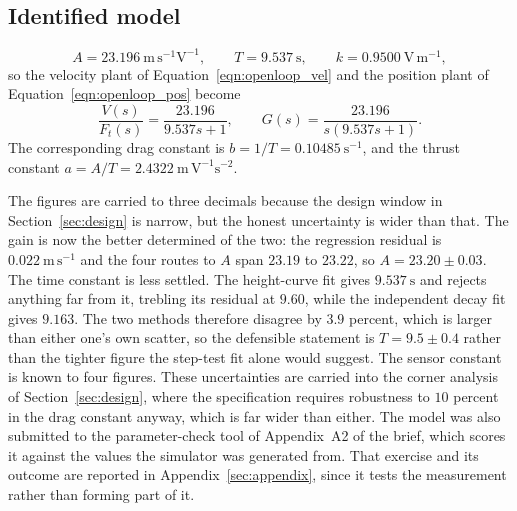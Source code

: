 \subsection{Identified model}
\begin{equation}\label{eqn:identified}
    A = 23.196\ \mathrm{m\,s^{-1}V^{-1}}, \qquad
    T = 9.537\ \mathrm{s}, \qquad
    k = 0.9500\ \mathrm{V\,m^{-1}} ,
\end{equation}
so the velocity plant of Equation~\eqref{eqn:openloop_vel} and the position plant of
Equation~\eqref{eqn:openloop_pos} become
\begin{equation}
    \frac{V(s)}{F_t(s)} = \frac{23.196}{9.537s + 1},
    \qquad
    G(s) = \frac{23.196}{s\left(9.537s + 1\right)} .
\end{equation}
The corresponding drag constant is $b = 1/T = 0.10485\ \mathrm{s^{-1}}$, and the thrust constant $a = A/T = 2.4322\ \mathrm{m\,V^{-1}s^{-2}}$.

The figures are carried to three decimals because the design window in
Section~\ref{sec:design} is narrow, but the honest uncertainty is wider than that. The gain is now
the better determined of the two: the regression residual is $0.022\ \mathrm{m\,s^{-1}}$ and the
four routes to $A$ span $23.19$ to $23.22$, so $A = 23.20 \pm 0.03$. The time constant is less settled. The height-curve fit gives $9.537\ \mathrm{s}$ and rejects
anything far from it, trebling its residual at $9.60$, while the independent decay fit gives
$9.163$. The two methods therefore disagree by $3.9$ percent, which is larger than either one's own
scatter, so the defensible statement is $T = 9.5 \pm 0.4$ rather than the tighter figure the
step-test fit alone would suggest. The sensor constant is known to four figures. These uncertainties are carried into the
corner analysis of Section~\ref{sec:design}, where the specification requires robustness to
$10$ percent in the drag constant anyway, which is far wider than either.
The model was also submitted to the parameter-check tool of Appendix~A2 of the brief, which
scores it against the values the simulator was generated from. That exercise and its outcome are
reported in Appendix~\ref{sec:appendix}, since it tests the measurement rather than forming part
of it.
